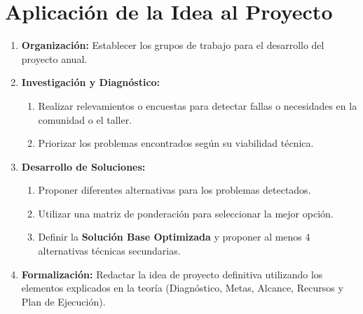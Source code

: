 \documentclass[../main]{subfiles}
\begin{document}
\chapter{Aplicación de la Idea al Proyecto}

\begin{enumerate}
  \item \textbf{Organización:} Establecer los grupos de trabajo para
    el desarrollo del proyecto anual.
  \item \textbf{Investigación y Diagnóstico:}
    \begin{enumerate}
      \item Realizar relevamientos o encuestas para detectar fallas o
        necesidades en la comunidad o el taller.
      \item Priorizar los problemas encontrados según su
        viabilidad técnica.
    \end{enumerate}
  \item \textbf{Desarrollo de Soluciones:}
    \begin{enumerate}
      \item Proponer diferentes alternativas para los problemas detectados.
      \item Utilizar una matriz de ponderación para seleccionar la mejor opción.
      \item Definir la \textbf{Solución Base Optimizada} y proponer
        al menos 4 alternativas técnicas secundarias.
    \end{enumerate}
  \item \textbf{Formalización:} Redactar la idea de proyecto
    definitiva utilizando los elementos explicados en la teoría (Diagnóstico, Metas, Alcance, Recursos y Plan de Ejecución).
\end{enumerate}
\end{document}
